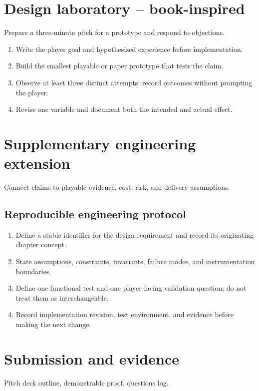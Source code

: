 \documentclass[11pt]{article}
\begin{document}
\section{Design laboratory -- book-inspired}
Prepare a three-minute pitch for a prototype and respond to objections.

\begin{enumerate}
\item Write the player goal and hypothesized experience before implementation.
\item Build the smallest playable or paper prototype that tests the claim.
\item Observe at least three distinct attempts; record outcomes without prompting the player.
\item Revise one variable and document both the intended and actual effect.
\end{enumerate}

\section{Supplementary engineering extension}
Connect claims to playable evidence, cost, risk, and delivery assumptions.


\subsection{Reproducible engineering protocol}
\begin{enumerate}
\item Define a stable identifier for the design requirement and record its originating chapter concept.
\item State assumptions, constraints, invariants, failure modes, and instrumentation boundaries.
\item Define one functional test and one player-facing validation question; do not treat them as interchangeable.
\item Record implementation revision, test environment, and evidence before making the next change.
\end{enumerate}

\section{Submission and evidence}
Pitch deck outline, demonstrable proof, questions log.
\end{document}
